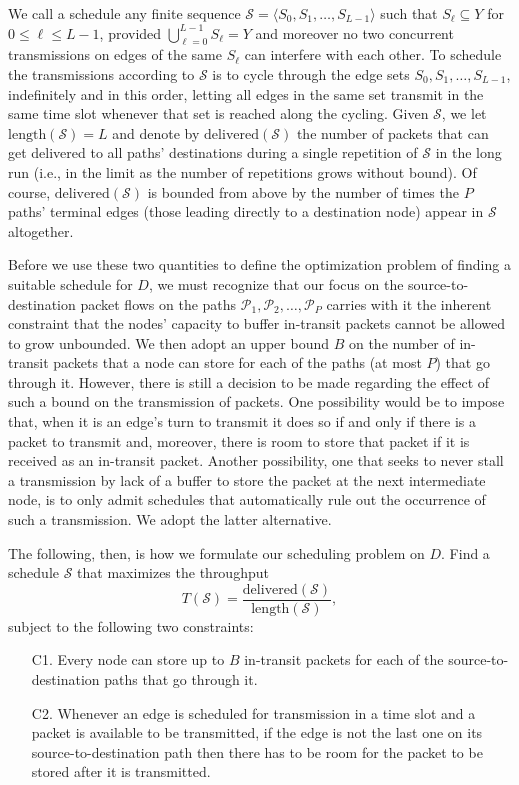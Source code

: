 \documentclass{article}
\begin{document}
We call a schedule any finite sequence
$\mathcal{S}=\langle S_0,S_1,\ldots,S_{L-1}\rangle$ such that
$S_\ell\subseteq Y$ for $0\le\ell\le L-1$, provided
$\bigcup_{\ell=0}^{L-1}S_\ell=Y$ and moreover no two concurrent transmissions on
edges of the same $S_\ell$ can interfere with each other. To schedule the
transmissions according to $\mathcal{S}$ is to cycle through the edge sets
$S_0,S_1,\ldots,S_{L-1}$, indefinitely and in this order, letting all edges in
the same set transmit in the same time slot whenever that set is reached along
the cycling. Given $\mathcal{S}$, we let $\mathrm{length}(\mathcal{S})=L$ and
denote by $\mathrm{delivered}(\mathcal{S})$ the number of packets that can get
delivered to all paths' destinations during a single repetition of $\mathcal{S}$
in the long run (i.e., in the limit as the number of repetitions grows without
bound). Of course, $\mathrm{delivered}(\mathcal{S})$ is bounded from above by
the number of times the $P$ paths' terminal edges (those leading directly to a
destination node) appear in $\mathcal{S}$ altogether.

Before we use these two quantities to define the optimization problem of finding
a suitable schedule for $D$, we must recognize that our focus on the
source-to-destination packet flows on the paths
$\mathcal{P}_1,\mathcal{P}_2,\ldots,\mathcal{P}_P$ carries with it the inherent
constraint that the nodes' capacity to buffer in-transit packets cannot be
allowed to grow unbounded. We then adopt an upper bound $B$ on the number of
in-transit packets that a node can store for each of the paths (at most $P$)
that go through it. However, there is still a decision to be made regarding the
effect of such a bound on the transmission of packets. One possibility would be
to impose that, when it is an edge's turn to transmit it does so if and only if
there is a packet to transmit and, moreover, there is room to store that packet
if it is received as an in-transit packet. Another possibility, one that seeks
to never stall a transmission by lack of a buffer to store the packet at the
next intermediate node, is to only admit schedules that automatically rule out
the occurrence of such a transmission. We adopt the latter alternative.

The following, then, is how we formulate our scheduling problem on $D$. Find a
schedule $\mathcal{S}$ that maximizes the throughput
\begin{equation}
T(\mathcal{S})=
\frac{\mathrm{delivered}(\mathcal{S})}{\mathrm{length}(\mathcal{S})},
\label{eq:throughput}
\end{equation}
subject to the following two constraints:
\begin{itemize}
\item[C1.] Every node can store up to $B$ in-transit packets for each of the
source-to-destination paths that go through it.
\item[C2.] Whenever an edge is scheduled for transmission in a time slot and a
packet is available to be transmitted, if the edge is not the last one on its
source-to-destination path then there has to be room for the packet to be stored
after it is transmitted.
\end{itemize}
\end{document}
